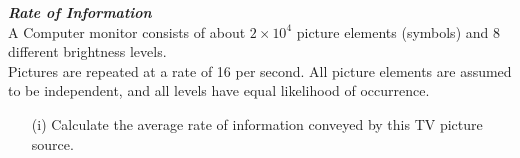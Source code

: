 \item[(b)] \textbf{\textit{Rate of Information}}\\
A Computer monitor consists of about $2 \times 10^4$ picture elements (symbols) and 8
different brightness levels.\\
\newline
Pictures are repeated at a rate of 16 per second. All picture elements
are assumed to be independent, and all levels have equal likelihood of occurrence. 
\begin{itemize}
\item[(i)] Calculate the
average rate of information conveyed by this TV picture source.
\end{itemize}
